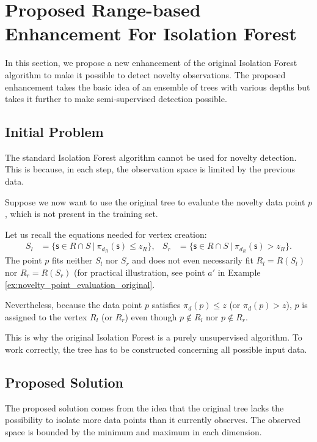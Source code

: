 \section{Proposed Range-based Enhancement For Isolation Forest}
\label{sec:novelty_isolation_forest}
In this section, we propose a new enhancement of the original Isolation Forest algorithm to make it possible to detect novelty observations.
The proposed enhancement takes the basic idea of an ensemble of trees with various depths but takes it further to make semi-supervised detection possible.

\subsection{Initial Problem}
\label{sec:InitialProblem}
 The standard Isolation Forest algorithm cannot be used for novelty detection. This is because, in each step, the observation space is limited by the previous data.


Suppose we now want to use the original tree to evaluate the novelty data point $p$, which is not present in the training set.

Let us recall the equations needed for vertex creation:
\begin{align*}
S_l &= \{ \mathsf{s} \in{R \cap S}\ |\ \pi_{d_R}(\mathsf{s})\le z_R\},&
S_r &= \{ \mathsf{s} \in{R \cap S}\ |\ \pi_{d_R}(\mathsf{s}) > z_R\}.
\end{align*}
The point $p$ fits neither $S_l$ nor $S_r$ and does not even necessarily fit $R_l = R(S_l)$ nor $R_r = R(S_r)$ (for practical illustration, see point $a'$ in Example \ref{ex:novelty_point_evaluation_original}.

Nevertheless, because the data point $p$ satisfies  $\pi_d(p) \le z$ (or $\pi_d(p) > z$), $p$ is assigned to the vertex $R_l$ (or $R_r$) even though $p \notin R_l$ nor $p \notin R_r$.

This is why the original Isolation Forest is a purely unsupervised algorithm. To work correctly, the tree has to be constructed concerning all possible input data.

\subsection{Proposed Solution}
The proposed solution comes from the idea that the original tree lacks the possibility to isolate more data points than it currently observes.
The observed space is bounded by the minimum and maximum in each dimension.

